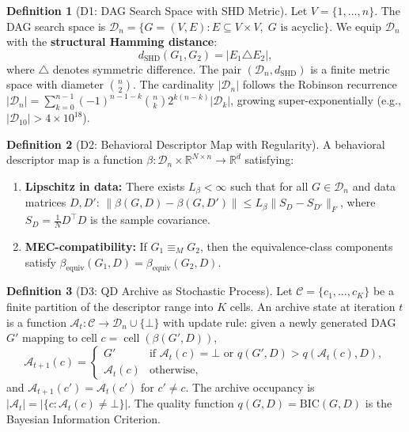 \documentclass{article}
\theoremstyle{definition}
\newtheorem{definition}{Definition}
\theoremstyle{plain}
\theoremstyle{remark}
\DeclareMathOperator{\cell}{cell}
\DeclareMathOperator{\SHD}{SHD}
\begin{document}
\begin{definition}[D1: DAG Search Space with SHD Metric]
\label{def:dag_space}
Let $V = \{1, \ldots, n\}$. The DAG search space is
$\mathcal{D}_n = \{G = (V, E) : E \subseteq V \times V,\; G \text{ is acyclic}\}$.
We equip $\mathcal{D}_n$ with the \textbf{structural Hamming distance}:
$$d_{\SHD}(G_1, G_2) = |E_1 \triangle E_2|,$$
where $\triangle$ denotes symmetric difference.
The pair $(\mathcal{D}_n, d_{\SHD})$ is a finite metric space with diameter
$\binom{n}{2}$. The cardinality $|\mathcal{D}_n|$ follows the Robinson recurrence
$|\mathcal{D}_n| = \sum_{k=0}^{n-1}(-1)^{n-1-k}\binom{n}{k}2^{k(n-k)}|\mathcal{D}_k|$,
growing super-exponentially (e.g., $|\mathcal{D}_{10}| > 4 \times 10^{18}$).
\end{definition}

\begin{definition}[D2: Behavioral Descriptor Map with Regularity]
\label{def:descriptor}
A behavioral descriptor map is a function
$\beta : \mathcal{D}_n \times \mathbb{R}^{N \times n} \to \mathbb{R}^d$
satisfying:
\begin{enumerate}
  \item[(a)] \textbf{Lipschitz in data:} There exists $L_\beta < \infty$ such
    that for all $G \in \mathcal{D}_n$ and data matrices $D, D'$:
    $\|\beta(G, D) - \beta(G, D')\| \leq L_\beta \|S_D - S_{D'}\|_F$,
    where $S_D = \frac{1}{N}D^\top D$ is the sample covariance.
  \item[(b)] \textbf{MEC-compatibility:} If $G_1 \equiv_M G_2$, then the
    equivalence-class components satisfy
    $\beta_{\mathrm{equiv}}(G_1, D) = \beta_{\mathrm{equiv}}(G_2, D)$.
\end{enumerate}
\end{definition}

\begin{definition}[D3: QD Archive as Stochastic Process]
\label{def:archive}
Let $\mathcal{C} = \{c_1, \ldots, c_K\}$ be a finite partition of the descriptor
range into $K$ cells. An archive state at iteration $t$ is a function
$\mathcal{A}_t : \mathcal{C} \to \mathcal{D}_n \cup \{\bot\}$
with update rule: given a newly generated DAG $G'$ mapping to cell
$c = \cell(\beta(G', D))$,
$$\mathcal{A}_{t+1}(c) = \begin{cases}
  G' & \text{if } \mathcal{A}_t(c) = \bot \text{ or } q(G', D) > q(\mathcal{A}_t(c), D), \\
  \mathcal{A}_t(c) & \text{otherwise,}
\end{cases}$$
and $\mathcal{A}_{t+1}(c') = \mathcal{A}_t(c')$ for $c' \neq c$.
The archive occupancy is $|\mathcal{A}_t| = |\{c : \mathcal{A}_t(c) \neq \bot\}|$.
The quality function $q(G, D) = \text{BIC}(G, D)$ is the Bayesian Information
Criterion.
\end{definition}
\end{document}
